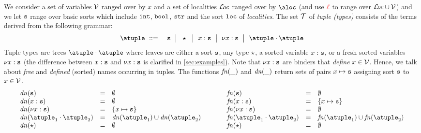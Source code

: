 %

We consider a set of variables $\varset$  ranged over by $x$
and a set of localities $\locset$ ranged over by $\aloc$ (and
use $\alocvar$ to range over $\locset\cup\varset$) and we let $\asort$
range over basic sorts which include $\asort[int]$, $\asort[bool]$,
$\asort[str]$ and the sort $\asort[loc]$ of \emph{localities}.
%
The set $\tupleset$ of \emph{tuple (types)} consists of the terms
derived from the following grammar:
\begin{eqnarray*}
  \atuple & \bnfdef & \asort \bnfmid
                        \wildcard\bnfmid
                      x : \asort \bnfmid
                      \nu x : \asort  \bnfmid
                      \atuple \cdot \atuple 
\end{eqnarray*}
Tuple types are trees  $\atuple \cdot \atuple$  where leaves are
 either a sort $\asort$, any type $\wildcard$,  a sorted variable $x : \asort$,
or a fresh sorted variables $\nu x : \asort$ 
(the difference between $x : \asort$ and $\nu x : \asort$ is clarified in \cref{sec:examples}).
Note that $\nu x : \asort$ are binders that \emph{define}
$x \in \varset$. 
%
Hence, we talk about \emph{free} and \emph{defined} (sorted) names occurring in
tuples.
%
%
The functions $\fn{\_}$ and $\dn{\_}$ return sets of pairs
$x \mapsto \asort$ assigning sort $\asort$ to $x \in \varset$.
\[
\begin{array}{l@{\hspace{1cm}}l}
\begin{array}{lcl}
  \dn\asort & = & \emptyset
  \\
  \dn{x : \asort} & = & \emptyset
  \\
  \dn{\nu x : \asort} & = & \{x \mapsto \asort \}
  \\
  \dn{\atuple_1 \cdot \atuple_2} & = & \dn{\atuple_1} \cup \dn{\atuple_2}
  \\
  \dn{\wildcard} & = & \emptyset
\end{array}
&
\begin{array}{lcl}
  \fn\asort & = & \emptyset
  \\
  \fn{x : \asort} & = &  \{x \mapsto \asort\}
  \\
  \fn{\nu x : \asort} & = & \emptyset
  \\
  \fn{\atuple_1 \cdot \atuple_2} & = & \fn{\atuple_1} \cup \fn{\atuple_2}
  \\
  \fn{\wildcard} & = & \emptyset
\end{array}
\end{array}
\]
